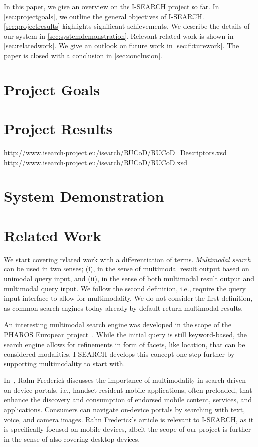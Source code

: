 \documentclass{acm_proc_article-sp}
\let\oldemph\emph
\renewcommand{\emph}[1]{\oldemph{\fontsize{9}{9}\selectfont #1}}
\newcommand{\inlinelistingsize}{\fontsize{8pt}{11pt}}
\let\oldurl\url
\renewcommand{\url}[1]{\inlinelistingsize\oldurl{#1}}
\begin{document}
In this paper, we give an overview on the \mbox{I-SEARCH} project so far.
In \autoref{sec:projectgoals}, we outline the general objectives of  \mbox{I-SEARCH}.
\autoref{sec:projectresults} highlights significant achievements.
We describe the details of our system in \autoref{sec:systemdemonstration}.
Relevant related work is shown in \autoref{sec:relatedwork}.
We give an outlook on future work in \autoref{sec:futurework}.
The paper is closed with a conclusion in \autoref{sec:conclusion}.

\section{Project Goals} \label{sec:projectgoals}


\section{Project Results} \label{sec:projectresults}
\url{http://www.isearch-project.eu/isearch/RUCoD/RUCoD_Descriptors.xsd}
\url{http://www.isearch-project.eu/isearch/RUCoD/RUCoD.xsd}

\section{System Demonstration} \label{sec:systemdemonstration}


\section{Related Work} \label{sec:relatedwork}
We start covering related work with a differentiation of terms.
\emph{Multimodal search} can be used in two senses; (i), in the sense of multimodal result output based on unimodal query input, and (ii), in the sense of both multimodal result output and multimodal query input.
We follow the second definition, i.e., require the query input interface to allow for multimodality.
We do not consider the first definition, as common search engines today already by default return multimodal results.

An interesting multimodal search engine was developed in the scope of the PHAROS European project~\cite{pharos2008}. While the initial query is still keyword-based, the search engine allows for refinements in form of facets, like location, that can be considered modalities.
\mbox{I-SEARCH} develops this concept one step further by supporting multimodality to start with.

In~\cite{multimodalitysun}, Rahn Frederick discusses the importance of multimodality in search-driven on-device portals, i.e., handset-resident mobile applications, often preloaded, that enhance the discovery and consumption of endorsed mobile content, services, and applications.
Consumers can navigate on-device portals by searching with text, voice, and camera images.
Rahn Frederick's article is relevant to \mbox{I-SEARCH}, as it is specifically focused on mobile devices, albeit the scope of our project is further in the sense of also covering desktop devices. 
\end{document}

